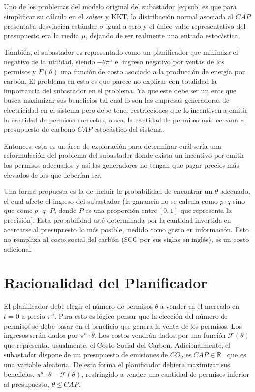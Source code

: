 Uno de los problemas del modelo original del subastador \ref{eq:sub} es que para simplificar su cálculo en el \textit{solver} y KKT, la distribución normal asociada al $CAP$ presentaba desviación estándar $\sigma$ igual a cero y el único valor representativo del presupuesto era la media $\mu$, dejando de ser realmente una entrada estocástica. 
\vspace{2.5mm}

También, el subastador es representado como un planificador que minimiza el negativo de la utilidad, siendo $-\theta \pi^a$ el ingreso negativo por ventas de los permisos y $F(\theta)$ una función de costo asociado a la producción de energía por carbón. El problema en esto es que parece no explicar con totalidad la importancia del subastador en el problema. Ya que este debe ser un ente que busca maximizar sus beneficios tal cual  lo son las empresas generadoras de electricidad en el sistema pero debe tener restricciones que lo incentiven a emitir la cantidad de permisos correctos, o sea, la cantidad de permisos más cercana al presupuesto de carbono $CAP$ estocástico del sistema.
\vspace{2.5mm}

Entonces, esta es un área de exploración para determinar cuál sería una reformulación del problema del subastador donde exista un incentivo por emitir los permisos adecuados y así los generadores no tengan que pagar precios más elevados de los que deberían ser.
\vspace{2.5mm}

Una forma propuesta es la de incluir la probabilidad de encontrar un $\theta$ adecuado, el cual afecte el ingreso del subastador (la ganancia no se calcula como $p\cdot q$ sino que como $p\cdot q\cdot P$, donde $P$ es una proporción entre $[0,1]$ que representa la precisión). Esta probabilidad esté determinada por la cantidad invertida en acercarse al presupuesto lo más posible, medido como gasto en información. Esto no remplaza al costo social del carbón (SCC por sus siglas en inglés), es un costo adicional.


\section{Racionalidad del Planificador}

El planificador debe elegir el número de permisos $\theta$ a vender en el mercado en $t=0$ a precio $\pi^a$. Para esto es lógico pensar que la elección del número de permisos se debe basar en el beneficio que genera la venta de los permisos. Los ingresos serán dados por $\pi^a\cdot\theta$. Los costos vendrán dados por una función $\mathcal{F}(\theta)$ que representa, usualmente, el Costo Social del Carbon. Adicionalmente, el subastador dispone de un presupuesto de emisiones de $CO_2$ es $CAP\in\mathbb{R}_+$ que es una variable aleatoria. De esta forma el planificador debiera maximizar sus beneficios, $\pi^a\cdot\theta-\mathcal{F}(\theta)$, restringido a vender una cantidad de permisos inferior al presupuesto, $\theta\leq CAP$.
\vspace{2.5mm}

